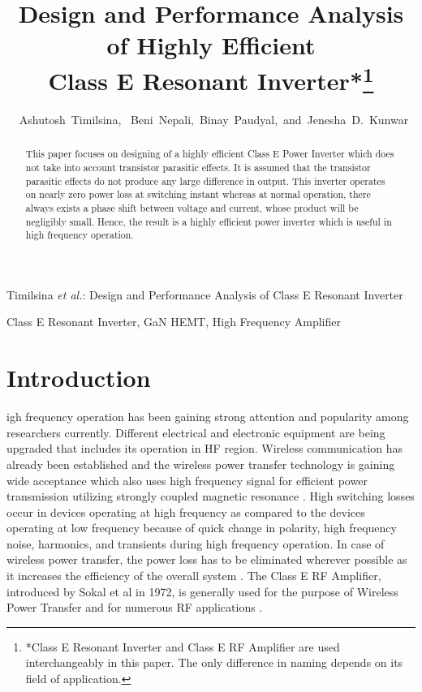 \documentclass[journal,twoside]{IEEEtran}
\begin{document}
    \setcounter{page}{33}
    \title{Design and Performance Analysis of Highly Efficient\\Class E Resonant Inverter*\thanks{*Class E Resonant Inverter and Class E RF Amplifier are used interchangeably in this paper. The only difference
in naming depends on its field of application.}}
    \author{{~Ashutosh~Timilsina,~    Beni~Nepali,~Binay~Paudyal,~and~Jenesha~D.~Kunwar}\\
    }


%
{Timilsina \MakeLowercase{\textit{et al.}}: Design and Performance Analysis of Class E Resonant Inverter}

    \maketitle
	\begin{abstract}
This paper focuses on designing of a highly efficient Class E Power Inverter which does not take into account transistor
parasitic effects. It is assumed that the transistor parasitic effects do not produce any large difference in output. This
inverter operates on nearly zero power loss at switching instant whereas at normal operation, there always exists a phase
shift between voltage and current, whose product will be negligibly small. Hence, the result is a highly efficient power
inverter which is useful in high frequency operation.
	\end{abstract}
	\begin{IEEEkeywords}
Class E Resonant Inverter, GaN HEMT, High Frequency Amplifier
	\end{IEEEkeywords}
	\section{Introduction}
igh frequency operation has been gaining strong attention
and popularity among researchers currently. Different
electrical and electronic equipment are being upgraded that
includes its operation in HF region. Wireless communication
has already been established and the wireless power transfer
technology is gaining wide acceptance which also uses high
frequency signal for efficient power transmission utilizing
strongly coupled magnetic resonance \cite{Kurs2007}. High switching
losses occur in devices operating at high frequency as
compared to the devices operating at low frequency because
of quick change in polarity, high frequency noise, harmonics,
and transients during high frequency operation. In case of
wireless power transfer, the power loss has to be eliminated
wherever possible as it increases the efficiency of the overall
system \cite{Fu2013}. The Class E RF Amplifier, introduced
by Sokal et al in 1972, is generally used for the purpose of
Wireless Power Transfer and for numerous RF applications
\cite{Klehn2009}.
\end{document}
